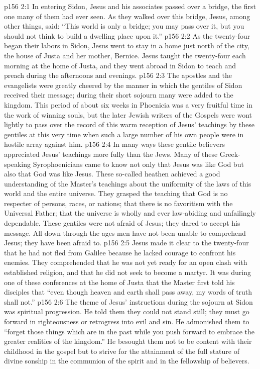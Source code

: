 \vs p156 2:1 In entering Sidon, Jesus and his associates passed over a bridge, the first one many of them had ever seen. As they walked over this bridge, Jesus, among other things, said: \textcolor{ubdarkred}{“This world is only a bridge; you may pass over it, but you should not think to build a dwelling place upon it.”}
\pc \vs p156 2:2 As the twenty\hyp{}four began their labors in Sidon, Jesus went to stay in a home just north of the city, the house of Justa and her mother, Bernice. Jesus taught the twenty\hyp{}four each morning at the home of Justa, and they went abroad in Sidon to teach and preach during the afternoons and evenings.
\vs p156 2:3 The apostles and the evangelists were greatly cheered by the manner in which the gentiles of Sidon received their message; during their short sojourn many were added to the kingdom. This period of about six weeks in Phoenicia was a very fruitful time in the work of winning souls, but the later Jewish writers of the Gospels were wont lightly to pass over the record of this warm reception of Jesus’ teachings by these gentiles at this very time when such a large number of his own people were in hostile array against him.\plusone
\vs p156 2:4 In many ways these gentile believers appreciated Jesus’ teachings more fully than the Jews. Many of these Greek\hyp{}speaking Syrophoenicians came to know not only that Jesus was like God but also that God was like Jesus. These so\hyp{}called heathen achieved a good understanding of the Master’s teachings about the uniformity of the laws of this world and the entire universe. They grasped the teaching that God is no respecter of persons, races, or nations; that there is no favoritism with the Universal Father; that the universe is wholly and ever law\hyp{}abiding and unfailingly dependable. These gentiles were not afraid of Jesus; they dared to accept his message. All down through the ages men have not been unable to comprehend Jesus; they have been afraid to.
\pc \vs p156 2:5 Jesus made it clear to the twenty\hyp{}four that he had not fled from Galilee because he lacked courage to confront his enemies. They comprehended that he was not yet ready for an open clash with established religion, and that he did not seek to become a martyr. It was during one of these conferences at the home of Justa that the Master first told his disciples that \textcolor{ubdarkred}{“even though heaven and earth shall pass away, my words of truth shall not.”}
\pc \vs p156 2:6 The theme of Jesus’ instructions during the sojourn at Sidon was spiritual progression. He told them they could not stand still; they must go forward in righteousness or retrogress into evil and sin. He admonished them to \textcolor{ubdarkred}{“forget those things which are in the past while you push forward to embrace the greater realities of the kingdom.”} He besought them not to be content with their childhood in the gospel but to strive for the attainment of the full stature of divine sonship in the communion of the spirit and in the fellowship of believers.
